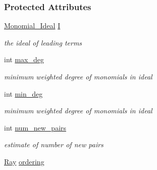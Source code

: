 \subsubsection*{Protected Attributes}
\begin{DoxyCompactItemize}
\item 
\mbox{\label{group___g_b_computation_a812c0be78a80ef2ecdd76e944a310363}} 
\hyperlink{group__polygroup_class_monomial___ideal}{Monomial\+\_\+\+Ideal} \hyperlink{group___g_b_computation_a812c0be78a80ef2ecdd76e944a310363}{I}
\begin{DoxyCompactList}\small\item\em the ideal of leading terms \end{DoxyCompactList}\item 
\mbox{\label{group___g_b_computation_a4fa101d6caf52005d20e4398c5ff5607}} 
int \hyperlink{group___g_b_computation_a4fa101d6caf52005d20e4398c5ff5607}{max\+\_\+deg}
\begin{DoxyCompactList}\small\item\em minimum weighted degree of monomials in ideal \end{DoxyCompactList}\item 
\mbox{\label{group___g_b_computation_ae0ede63491bf929c811c31d8ecf1051e}} 
int \hyperlink{group___g_b_computation_ae0ede63491bf929c811c31d8ecf1051e}{min\+\_\+deg}
\begin{DoxyCompactList}\small\item\em minimum weighted degree of monomials in ideal \end{DoxyCompactList}\item 
\mbox{\label{group___g_b_computation_a79e7e4059e2ea811bc14a4c02de96c52}} 
int \hyperlink{group___g_b_computation_a79e7e4059e2ea811bc14a4c02de96c52}{num\+\_\+new\+\_\+pairs}
\begin{DoxyCompactList}\small\item\em estimate of number of new pairs \end{DoxyCompactList}\item 
\mbox{\label{group___g_b_computation_ad4bc39f15f722a821f59db51b48a5d0f}} 
\hyperlink{group___c_l_s_solvers_class_l_p___solvers_1_1_ray}{Ray} \hyperlink{group___g_b_computation_ad4bc39f15f722a821f59db51b48a5d0f}{ordering}

\end{DoxyCompactItemize}
